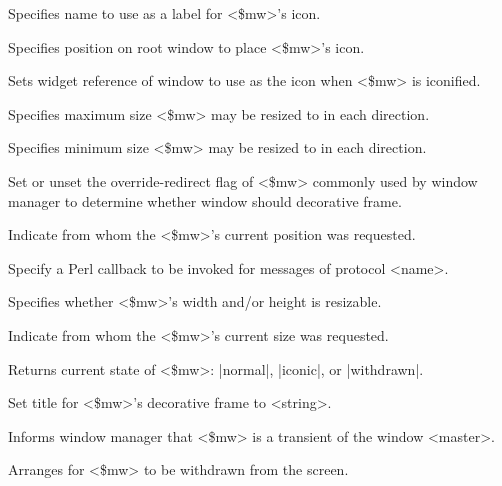\begin{enum}{1cm}
Specifies name to use as a label for <\$mw>'s icon.

Specifies position on root window to place <\$mw>'s icon.

Sets widget reference of window to use as the icon when <\$mw> is iconified.

Specifies maximum size <\$mw> may be resized to in each direction.

Specifies minimum size <\$mw> may be resized to in each direction.

Set or unset the override-redirect flag of <\$mw> commonly used by
window manager to determine whether window should decorative frame.

Indicate from whom the <\$mw>'s current position was requested.

Specify a Perl callback to be invoked for messages of protocol <name>.

Specifies whether <\$mw>'s width and/or height is resizable.

Indicate from whom the <\$mw>'s current size was requested.

Returns current state of <\$mw>: |normal|, |iconic|, or |withdrawn|.

Set title for <\$mw>'s decorative frame to <string>.

Informs window manager that <\$mw> is a transient of the window <master>.

Arranges for <\$mw> to be withdrawn from the screen.

\end{enum}


